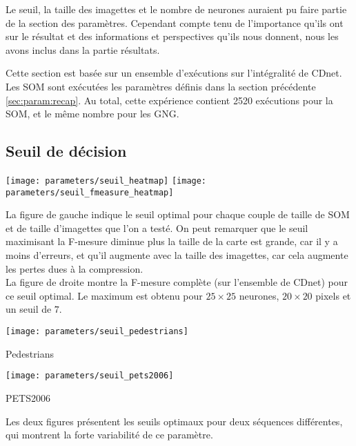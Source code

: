 	Le seuil, la taille des imagettes et le nombre de neurones auraient pu faire partie de la section des paramètres. Cependant compte tenu de l'importance qu'ils ont sur le résultat et des informations et perspectives qu'ils nous donnent, nous les avons inclus dans la partie résultats.

	Cette section est basée sur un ensemble d'exécutions sur l'intégralité de CDnet. Les SOM sont exécutées les paramètres définis dans la section précédente \ref{sec:param:recap}. Au total, cette expérience contient 2520 exécutions pour la SOM, et le même nombre pour les GNG. 

	\subsection{Seuil de décision}

	\begin{figureth}
		\texttt{[image: parameters/seuil\_heatmap]}
		\texttt{[image: parameters/seuil\_fmeasure\_heatmap]}
		\caption[Seuil de décision]{La figure de gauche indique le seuil optimal pour chaque couple de taille de SOM et de taille d'imagettes que l'on a testé. On peut remarquer que le seuil maximisant la F-mesure diminue plus la taille de la carte est grande, car il y a moins d'erreurs, et qu'il augmente avec la taille des imagettes, car cela augmente les pertes dues à la compression.\\

		La figure de droite montre la F-mesure complète (sur l'ensemble de CDnet) pour ce seuil optimal. Le maximum est obtenu pour $25\times25$ neurones, $20\times20$ pixels et un seuil de $7$.}\label{fig:res:seuil}

	\end{figureth}
		\begin{figureth}
		\begin{subfigureth}{.48\textwidth}
			\texttt{[image: parameters/seuil\_pedestrians]}\caption{Pedestrians}
		\end{subfigureth}
		\begin{subfigureth}{.48\textwidth}
			\texttt{[image: parameters/seuil\_pets2006]}\caption{PETS2006}
		\end{subfigureth}
		\caption[Seuil de décision en fonction de la séquence]{Les deux figures présentent les seuils optimaux pour deux séquences différentes, qui montrent la forte variabilité de ce paramètre.}\label{fig:res:seuil_seq}
	\end{figureth}

